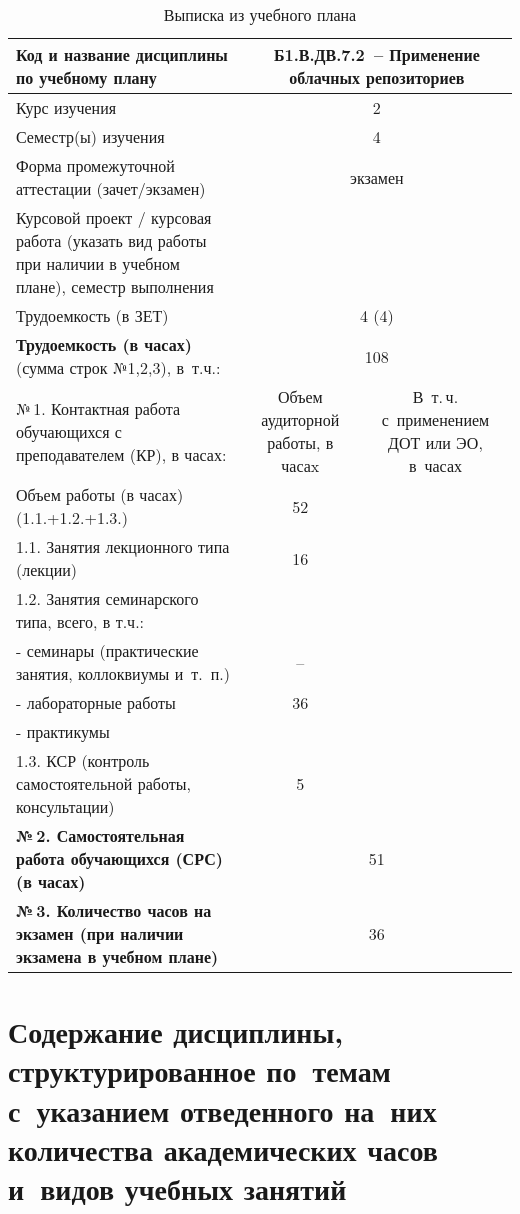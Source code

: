 \documentclass[a4paper,12pt]{article}
\begin{document}
\begin{table}[H]
\caption{Выписка из учебного плана} 
\begin{tabular}{|p{9cm}|c|c|}
\hline
Код и название дисциплины по учебному плану & \multicolumn{2}{p{6cm}|}{Б1.В.ДВ.7.2\ -- Применение облачных репозиториев }\\
\hline
Курс изучения &\multicolumn{2}{c|}{ 2 }\\
\hline
Семестр(ы) изучения &\multicolumn{2}{c|}{ 4 }\\
\hline
Форма промежуточной аттестации (зачет/экзамен) &\multicolumn{2}{c|}{ экзамен }\\
\hline
Курсовой проект / курсовая работа (указать вид работы при наличии в учебном плане), семестр выполнения &\multicolumn{2}{c|}{ }\\
\hline
Трудоемкость (в ЗЕТ) &\multicolumn{2}{c|}{ 4 (4) }\\
\hline
{\bf Трудоемкость (в часах)} (сумма строк №1,2,3), в~т.ч.:& \multicolumn{2}{c|}{108}\\
\hline
№\,1. Контактная работа обучающихся с преподавателем (КР), в часах:
& \multicolumn{1}{p{3cm}|}{\centering Объем аудиторной работы, в часаx}
& \multicolumn{1}{p{3cm}|}{\centering\arraybackslash В~т.\,ч. с~применением ДОТ или ЭО, в~часах}\\
\hline  
Объем работы (в часах) (1.1.+1.2.+1.3.)& 52 & \\
\hline
1.1. Занятия лекционного типа (лекции) & 16 & \\
\hline
1.2. Занятия семинарского типа, всего, в т.ч.: & & \\
\hline
- семинары (практические занятия, коллоквиумы и~т.~п.)  & – & \\
\hline
- лабораторные работы& 36 & \\
\hline
- практикумы & & \\
\hline
1.3. КСР (контроль самостоятельной работы, консультации)& 5 & \\
\hline
{\bf №\,2. Самостоятельная работа обучающихся (СРС) (в часах)}& \multicolumn{2}{c|}{51}\\
\hline
{\bf №\,3. Количество часов на экзамен (при наличии экзамена в учебном плане)}& \multicolumn{2}{c|}{36}\\
\hline
\end{tabular}
\end{table}

\newpage
\section{Содержание дисциплины, структурированное по~темам с~указанием отведенного на~них количества академических часов и~видов учебных занятий}
\end{document}
